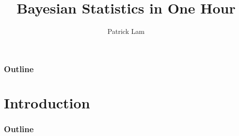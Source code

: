 \documentclass{beamer}
\author{Patrick Lam}
\title{Bayesian Statistics in One Hour}
\date{}
\begin{document}
\newcommand{\red}{\textcolor{red}}
\newcommand{\blue}{\textcolor{blue}}
\newcommand{\purple}{\textcolor{purple}}
\newcommand{\brown}{\textcolor{brown}}
\newcommand{\cyan}{\textcolor{cyan}}

\frame{\titlepage}

\begin{frame}
\frametitle{Outline}
\tableofcontents
\end{frame}

\section{Introduction}

\begin{frame}
\frametitle{Outline}
\tableofcontents[currentsection]
\end{frame}
\end{document}

